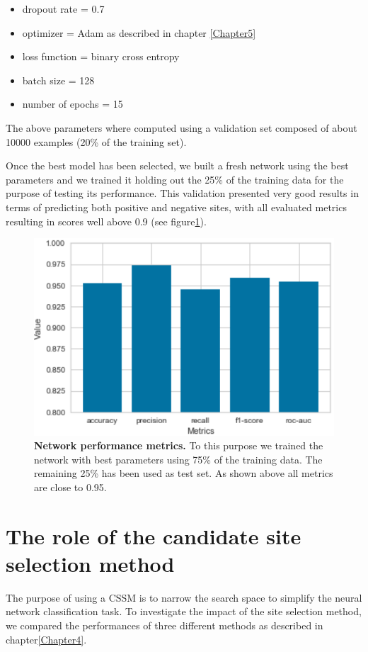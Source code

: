 \begin{itemize}
	\item dropout rate = 0.7
	\item optimizer = Adam as described in chapter \ref{Chapter5}
	\item loss function = binary cross entropy
	\item batch size = 128
	\item number of epochs = 15
\end{itemize}

The above parameters where computed using a validation set composed of about 10000 examples (20\% of the training set).

Once the best model has been selected, we built a fresh network using the best parameters and we trained it holding out the 25\% of the training data for the purpose of testing its performance. This validation presented very good results in terms of predicting both positive and negative sites, with all evaluated metrics resulting in scores well above 0.9 (see figure\ref{fig:network_evaluation}).

\begin{figure}[hbt!]
	\centering
	\includegraphics[width=\textwidth]{Figures/network_evaluation}
	\caption{\textbf{Network performance metrics.} To this purpose we trained the network with best parameters using 75\% of the training data. The remaining 25\% has been used as test set. As shown above all metrics are close to 0.95.}
	\label{fig:network_evaluation}
\end{figure}

\section{The role of the candidate site selection method}
The purpose of using a CSSM is to narrow the search space to simplify the neural network classification task. To investigate the impact of the site selection method, we compared the performances of three different methods as described in chapter\ref{Chapter4}. 

